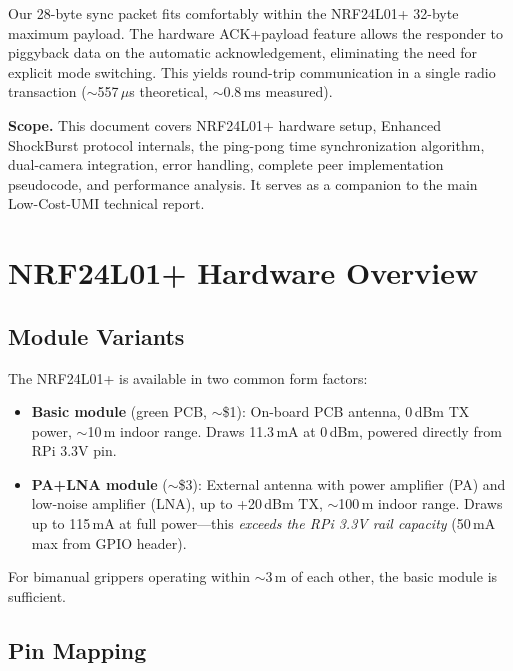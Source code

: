 \documentclass[11pt,a4paper]{article}
\begin{document}
\begin{infobox}
Our 28-byte sync packet fits comfortably within the NRF24L01+ 32-byte maximum payload. The hardware ACK+payload feature allows the responder to piggyback data on the automatic acknowledgement, eliminating the need for explicit mode switching. This yields round-trip communication in a single radio transaction (${\sim}$557\,$\mu$s theoretical, ${\sim}$0.8\,ms measured).
\end{infobox}

\textbf{Scope.} This document covers NRF24L01+ hardware setup, Enhanced ShockBurst protocol internals, the ping-pong time synchronization algorithm, dual-camera integration, error handling, complete peer implementation pseudocode, and performance analysis. It serves as a companion to the main Low-Cost-UMI technical report.


\section{NRF24L01+ Hardware Overview}

\subsection{Module Variants}

The NRF24L01+ is available in two common form factors:

\begin{itemize}
  \item \textbf{Basic module} (green PCB, ${\sim}$\$1): On-board PCB antenna, 0\,dBm TX power, ${\sim}$10\,m indoor range. Draws 11.3\,mA at 0\,dBm, powered directly from RPi 3.3V pin.
  \item \textbf{PA+LNA module} (${\sim}$\$3): External antenna with power amplifier (PA) and low-noise amplifier (LNA), up to +20\,dBm TX, ${\sim}$100\,m indoor range. Draws up to 115\,mA at full power---this \emph{exceeds the RPi 3.3V rail capacity} (50\,mA max from GPIO header).
\end{itemize}

For bimanual grippers operating within ${\sim}$3\,m of each other, the basic module is sufficient.

\subsection{Pin Mapping}
\end{document}
